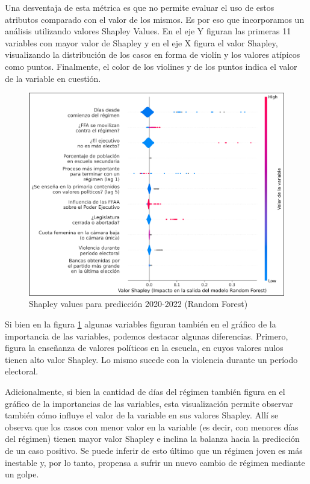 \documentclass{article}
\begin{document}
Una desventaja de esta métrica es que no permite evaluar el uso de estos atributos comparado con el valor
de los mismos. Es por eso que incorporamos un análisis utilizando valores Shapley Values. En el eje Y 
figuran las primeras 11 variables con mayor valor de Shapley y en el eje X figura el valor Shapley, 
visualizando la distribución de los casos en forma de violín y los valores atípicos como puntos. Finalmente, 
el color de los violines y de los puntos indica el valor de la variable en cuestión.

\begin{figure}[H]
 \centering
 \includegraphics[width=1\textwidth]{9_shapley_values_rf.png}
 \caption{Shapley values para predicción 2020-2022 (Random Forest)\label{fig:shapley_rf}}
\end{figure}

Si bien en la figura \ref{fig:shapley_rf} algunas variables figuran también en el gráfico de la 
importancia de las variables, podemos destacar algunas diferencias. Primero, figura la enseñanza de 
valores políticos en la escuela, en cuyos valores nulos tienen alto valor Shapley. Lo mismo sucede
con la violencia durante un período electoral.

Adicionalmente, si bien la cantidad de días del régimen también figura en el gráfico de la 
importancias de las variables, esta visualización permite observar también cómo influye el valor
de la variable en sus valores Shapley. Allí se observa que los casos con menor valor en la variable 
(es decir, con menores días del régimen) tienen mayor valor Shapley e inclina la balanza hacia la 
predicción de un caso positivo. Se puede inferir de esto último que un régimen joven es más 
inestable y, por lo tanto, propensa a sufrir un nuevo cambio de régimen mediante un golpe.
\end{document}
